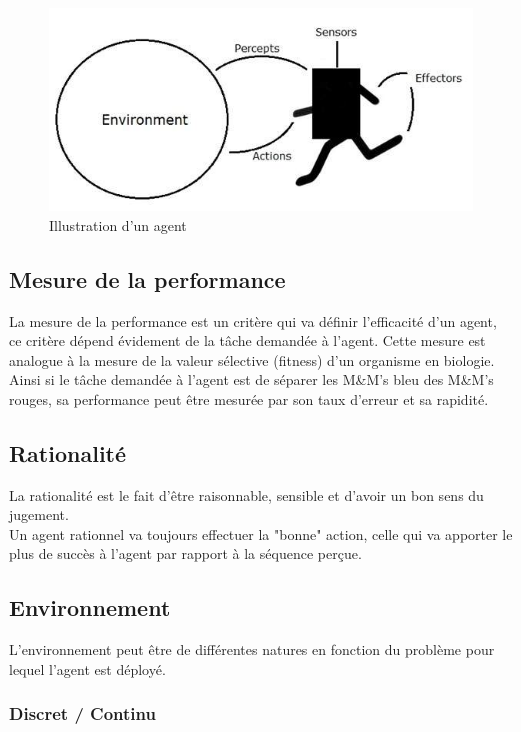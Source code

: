 \documentclass{article}
\begin{document}
\begin{figure}[H]
\begin{center}
	\includegraphics[scale=0.5]{agent_environment.jpg}
	\caption{Illustration d'un agent}
\end{center}
\end{figure}

\subsection{Mesure de la performance}

La mesure de la performance est un critère qui va définir l'efficacité d'un agent, ce critère dépend évidement de la tâche demandée à l'agent. Cette mesure est analogue à la mesure de la valeur sélective (fitness) d'un organisme en biologie. Ainsi si le tâche demandée à l'agent est de séparer les M\&M's bleu des M\&M's rouges, sa performance peut être mesurée par son taux d'erreur et sa rapidité.

\subsection{Rationalité}

La rationalité est le fait d'être raisonnable, sensible et d'avoir un bon sens du jugement.\\
Un agent rationnel va toujours effectuer la "bonne" action, celle qui va apporter le plus de succès à l'agent par rapport à la séquence perçue.\cite{tutoptai}

\subsection{Environnement}

L'environnement peut être de différentes natures en fonction du problème pour lequel l'agent est déployé.

\subsubsection{Discret / Continu}
\end{document}
